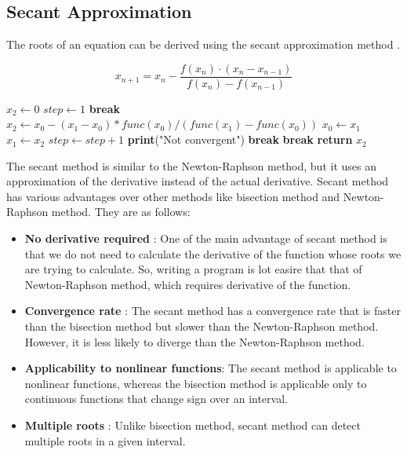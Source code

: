 \documentclass{report}
\begin{document}
\subsection{Secant Approximation}
\begin{flushleft}
The roots of an equation can be derived using the secant approximation method \cite{Wikipedia:SecantMethod}.
\end{flushleft}
$$ x_{n+1} = x_n - \frac{f(x_n) \cdot (x_n - x_{n-1})}{f(x_n) - f(x_{n-1})} $$
\begin{algorithmic}[1]
    \State $x_2 \gets 0$
    \State $step \gets 1$
            \State \textbf{break}
        \EndIf
        \State $x_2 \gets x_0 - (x_1 - x_0) * func(x_0) / (func(x_1) - func(x_0))$
        \State $x_0 \gets x_1$
        \State $x_1 \gets x_2$
        \State $step \gets step + 1$
            \State \textbf{print}("Not convergent")
            \State \textbf{break}
        \EndIf
            \State \textbf{break}
        \EndIf
    \EndWhile
    \State \textbf{return} $x_2$
\EndFunction
\end{algorithmic}
\begin{flushleft}
  The secant method is similar to the Newton-Raphson method, but it uses an approximation of the derivative instead of the actual derivative. Secant method has various advantages over other methods like bisection method and Newton-Raphson method. They are as follows:
  \begin{itemize}
    \item \textbf{No derivative required} : One of the main advantage of secant method is that we do not need to calculate the derivative of the function whose roots we are trying to calculate. So, writing a program is lot easire that that of Newton-Raphson method, which requires derivative of the function.
    \item \textbf{Convergence rate} : The secant method has a convergence rate that is faster than the bisection method but slower than the Newton-Raphson method. However, it is less likely to diverge than the Newton-Raphson method.
    \item \textbf{Applicability to nonlinear functions}: The secant method is applicable to nonlinear functions, whereas the bisection method is applicable only to continuous functions that change sign over an interval.
    \item \textbf{Multiple roots} : Unlike bisection method, secant method can detect multiple roots in a given interval.
  \end{itemize}
\end{flushleft}
\end{document}
